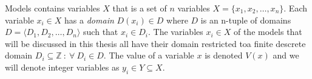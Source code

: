 Models contains variables $X$ that is a set of $n$ variables $X = \{ x_1, x_2, \dots , x_n \} $. Each 
variable $x_i \in X$ has a \emph{domain} $D(x_i) \in D$ where $D$ is an n-tuple of domains $D = \langle D_1, D_2, \dots 
, D_n 
\rangle $ such that $x_i \in D_i$. The variables $x_i \in X$ of the models that will be discussed in this thesis all 
have their domain restricted toa finite descrete domain $D_i \subseteq \mathbb{Z}\ : \: \forall \ D_i \in D$. The value 
of a variable $x$ is denoted $V(x)$ and we will denote integer variables as $y_i \in Y \subseteq X$. 